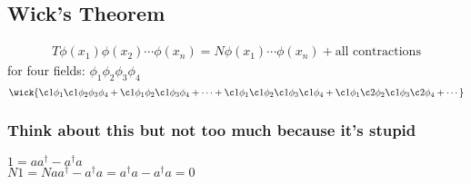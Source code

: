 \documentclass[]{scrartcl}
\begin{document}
\subsection{Wick's Theorem}

\begin{gather}
	T\phi(x_1)\phi(x_2)\cdots\phi(x_n) = N\phi(x_1)\cdots\phi(x_n) + \text{all contractions}
\end{gather}
for four fields: $\phi_1\phi_2\phi_3\phi_4$
\begin{equation}
	\wick{
	\c1\phi_1\c1\phi_2\phi_3\phi_4 + \c1\phi_1\phi_2\c1\phi_3\phi_4 + \cdots + \c1\phi_1\c1\phi_2\c1\phi_3\c1\phi_4 + \c1\phi_1\c2\phi_2\c1\phi_3\c2\phi_4 + \cdots
	}
\end{equation}

\subsubsection{Think about this but not too much because it's stupid}

$1 = aa^\dagger - a^\dagger a$\\
$N 1 = N aa^\dagger - a^\dagger a = a^\dagger a - a^\dagger a = 0$
\end{document}
